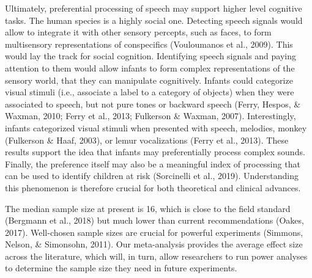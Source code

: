 \documentclass[man]{apa6}
\begin{document}
Ultimately, preferential processing of speech may support higher level
cognitive tasks. The human species is a highly social one. Detecting
speech signals would allow to integrate it with other sensory percepts,
such as faces, to form multisensory representations of conspecifics
(Vouloumanos et al., 2009). This would lay the track for social
cognition. Identifying speech signals and paying attention to them would
allow infants to form complex representations of the sensory world, that
they can manipulate cognitively. Infants could categorize visual stimuli
(i.e., associate a label to a category of objects) when they were
associated to speech, but not pure tones or backward speech (Ferry,
Hespos, \& Waxman, 2010; Ferry et al., 2013; Fulkerson \& Waxman, 2007).
Interestingly, infants categorized visual stimuli when presented with
speech, melodies, monkey (Fulkerson \& Haaf, 2003), or lemur
vocalizations (Ferry et al., 2013). These results support the idea that
infants may preferentially process complex sounds. Finally, the
preference itself may also be a meaningful index of processing that can
be used to identify children at risk (Sorcinelli et al., 2019).
Understanding this phenomenon is therefore crucial for both theoretical
and clinical advances.

The median sample size at present is 16, which is close to the field
standard (Bergmann et al., 2018) but much lower than current
recommendations (Oakes, 2017). Well-chosen sample sizes are crucial for
powerful experiments (Simmons, Nelson, \& Simonsohn, 2011). Our
meta-analysis provides the average effect size across the literature,
which will, in turn, allow researchers to run power analyses to
determine the sample size they need in future experiments.
\end{document}
